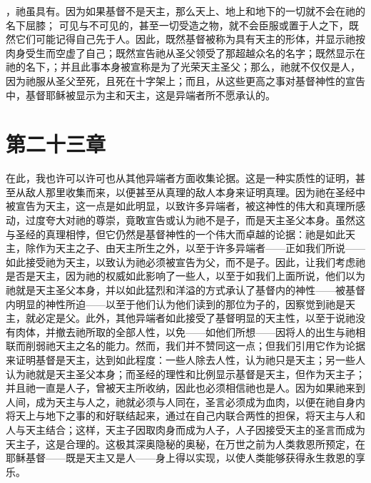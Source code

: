 ，祂虽具有。因为如果基督不是天主，那么天上、地上和地下的一切就不会在祂的名下屈膝； 可见与不可见的，甚至一切受造之物，就不会臣服或置于人之下，既然它们可能记得自己先于人。因此，既然基督被称为具有天主的形体，并显示祂按肉身受生而空虚了自己；既然宣告祂从圣父领受了那超越众名的名字；既然显示在祂的名下，；并且此事本身被宣称是为了光荣天主圣父；那么，祂就不仅仅是人，因为祂服从圣父至死，且死在十字架上；而且，从这些更高之事对基督神性的宣告中，基督耶稣被显示为主和天主，这是异端者所不愿承认的。\par


\section{第二十三章}

\par

在此，我也许可以许可也从其他异端者方面收集论据。这是一种实质性的证明，甚至从敌人那里收集而来，以便甚至从真理的敌人本身来证明真理。因为祂在圣经中被宣告为天主，这一点是如此明显，以致许多异端者，被这神性的伟大和真理所感动，过度夸大对祂的尊崇，竟敢宣告或认为祂不是子，而是天主圣父本身。虽然这与圣经的真理相悖，但它仍然是基督神性的一个伟大而卓越的论据：祂是如此天主，除作为天主之子、由天主所生之外，以至于许多异端者——正如我们所说——如此接受祂为天主，以致认为祂必须被宣告为父，而不是子。因此，让我们考虑祂是否是天主，因为祂的权威如此影响了一些人，以至于如我们上面所说，他们以为祂就是天主圣父本身，并以如此猛烈和洋溢的方式承认了基督内的神性——被基督内明显的神性所迫——以至于他们认为他们读到的那位为子的，因察觉到祂是天主，就必定是父。此外，其他异端者如此接受了基督明显的天主性，以至于说祂没有肉体，并撤去祂所取的全部人性，以免——如他们所想——因将人的出生与祂相联而削弱祂天主之名的能力。然而，我们并不赞同这一点；但我们引用它作为论据来证明基督是天主，达到如此程度：一些人除去人性，认为祂只是天主；另一些人认为祂就是天主圣父本身；而圣经的理性和比例显示基督是天主，但作为天主子；并且祂一直是人子，曾被天主所收纳，因此也必须相信祂也是人。因为如果祂来到人间，成为天主与人之，祂就必须与人同在，圣言必须成为血肉，以便在祂自身内将天上与地下之事的和好联结起来，通过在自己内联合两性的担保，将天主与人和人与天主结合；这样，天主子因取肉身而成为人子，人子因接受天主的圣言而成为天主子，这是合理的。这极其深奥隐秘的奥秘，在万世之前为人类救恩所预定，在耶稣基督——既是天主又是人——身上得以实现，以使人类能够获得永生救恩的享乐。\par

